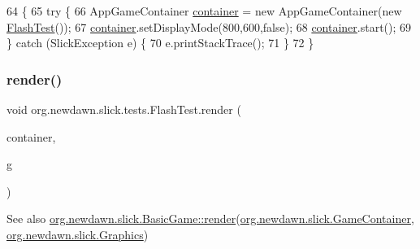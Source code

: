 \begin{DoxyCode}
64                                            \{
65         \textcolor{keywordflow}{try} \{
66             AppGameContainer \mbox{\hyperlink{classorg_1_1newdawn_1_1slick_1_1tests_1_1_flash_test_ad78e2796710293c14d8913b36a8e9e01}{container}} = \textcolor{keyword}{new} AppGameContainer(\textcolor{keyword}{new} 
      \mbox{\hyperlink{classorg_1_1newdawn_1_1slick_1_1tests_1_1_flash_test_a87a0e80ab43bf543fad77233ee937c24}{FlashTest}}());
67             \mbox{\hyperlink{classorg_1_1newdawn_1_1slick_1_1tests_1_1_flash_test_ad78e2796710293c14d8913b36a8e9e01}{container}}.setDisplayMode(800,600,\textcolor{keyword}{false});
68             \mbox{\hyperlink{classorg_1_1newdawn_1_1slick_1_1tests_1_1_flash_test_ad78e2796710293c14d8913b36a8e9e01}{container}}.start();
69         \} \textcolor{keywordflow}{catch} (SlickException e) \{
70             e.printStackTrace();
71         \}
72     \}
\end{DoxyCode}
\mbox{\label{classorg_1_1newdawn_1_1slick_1_1tests_1_1_flash_test_a19cae927c317fc4535df1fb7c8c95d59}} 
\subsubsection{\texorpdfstring{render()}{render()}}
{\footnotesize\ttfamily void org.\+newdawn.\+slick.\+tests.\+Flash\+Test.\+render (\begin{DoxyParamCaption}\item[{\mbox{\hyperlink{classorg_1_1newdawn_1_1slick_1_1_game_container}{Game\+Container}}}]{container,  }\item[{\mbox{\hyperlink{classorg_1_1newdawn_1_1slick_1_1_graphics}{Graphics}}}]{g }\end{DoxyParamCaption})\hspace{0.3cm}{\ttfamily [inline]}}

\begin{DoxySeeAlso}{See also}
\mbox{\hyperlink{interfaceorg_1_1newdawn_1_1slick_1_1_game_af1a4670d43eb3ba04dfcf55ab1975b64}{org.\+newdawn.\+slick.\+Basic\+Game\+::render}}(\mbox{\hyperlink{classorg_1_1newdawn_1_1slick_1_1_game_container}{org.\+newdawn.\+slick.\+Game\+Container}}, \mbox{\hyperlink{classorg_1_1newdawn_1_1slick_1_1_graphics}{org.\+newdawn.\+slick.\+Graphics}}) 
\end{DoxySeeAlso}


